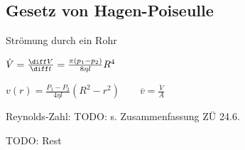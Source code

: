 \begin{sectionbox}
	\subsection{Gesetz von Hagen-Poiseulle}
	Strömung durch ein Rohr\\
	\begin{emphbox}
		$\dot{V}=\frac{\diff V}{\diff t}=\frac{\pi (p_1-p_2)}{8\eta l}R^4$\\
	\end{emphbox}
	$v(r)=\frac{P_1-P_2}{4\eta l}(R^2-r^2) \qquad \overline{v}=\frac{\dot V}{A}$
\end{sectionbox}

Reynolds-Zahl: TODO: s. Zusammenfassung ZÜ 24.6.

TODO: Rest